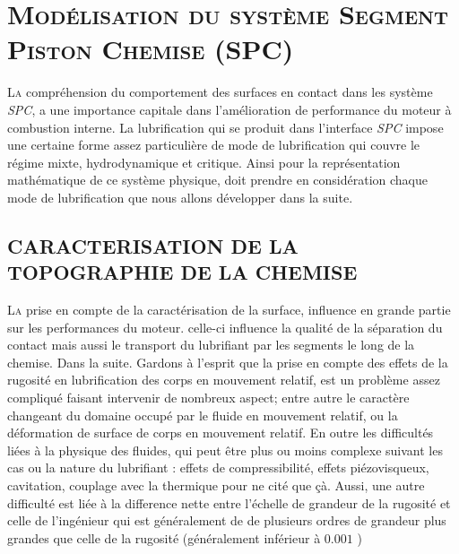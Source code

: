 
\chapter{\textsc{Modélisation du système Segment Piston Chemise (SPC)} }
\lettrine{L}{a} compréhension du comportement des surfaces en contact dans les système \emph{SPC}, a une importance capitale dans l'amélioration de performance du moteur à combustion interne. La lubrification qui se produit dans l'interface \emph{SPC} impose une certaine forme assez particulière de mode de lubrification qui couvre le régime mixte, hydrodynamique et critique. Ainsi pour la représentation mathématique de ce système physique, doit prendre en considération chaque mode de lubrification que nous allons développer dans la suite.
\section{CARACTERISATION DE LA TOPOGRAPHIE  DE LA CHEMISE}

\lettrine{L}{a} prise en compte de la caractérisation de la surface, influence en grande partie sur les performances du moteur. celle-ci influence la qualité de la séparation du contact mais aussi le transport du lubrifiant par les segments le long de la chemise. Dans la suite. Gardons à l'esprit que la prise en compte des effets de la rugosité en lubrification des corps en mouvement relatif, est un problème assez compliqué faisant intervenir de nombreux aspect; entre autre le caractère changeant du domaine occupé par le fluide en mouvement relatif, ou la déformation de surface de corps en mouvement relatif. En outre les difficultés liées à la physique des fluides, qui peut être plus ou moins complexe suivant les cas ou la nature du lubrifiant : effets de compressibilité, effets piézovisqueux, cavitation, couplage avec la thermique pour ne cité que çà. Aussi, une autre difficulté est liée à la difference nette entre l'échelle de grandeur de la rugosité et celle de l'ingénieur qui est généralement de de plusieurs ordres de grandeur plus grandes que celle de la rugosité (généralement inférieur à $0.001$ )\cite{initiation}\\

